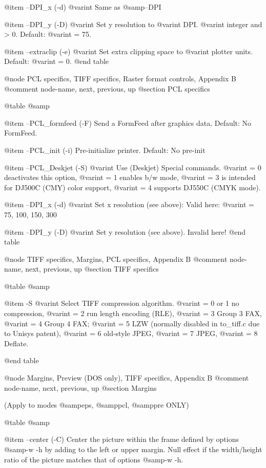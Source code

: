 @item --DPI_x (-d) @var{int}
Same as @samp{--DPI}

@item --DPI_y (-D) @var{int}
Set y resolution to @var{int} DPI. @var{int} integer and > 0.
Default: @var{int} = 75.

@item --extraclip (-e) @var{int}
Set extra clipping space to @var{int} plotter units. Default: @var{int} = 0.
@end table



@node PCL specifics, TIFF specifics, Raster format controls, Appendix B
@comment  node-name,  next,  previous,  up
@section  PCL specifics

@table @samp

@item --PCL_formfeed (-F)
Send a FormFeed after graphics data. Default: No FormFeed.

@item --PCL_init (-i)
Pre-initialize printer. Default: No pre-init

@item --PCL_Deskjet (-S) @var{int}
Use (Deskjet) Special commands. @var{int} = 0 deactivates this option,
@var{int} = 1 enables b/w mode, @var{int} = 3 is intended for DJ500C
(CMY) color support, @var{int} = 4 supports DJ550C (CMYK mode).

@item --DPI_x (-d) @var{int}
Set x resolution (see above): Valid here: @var{int} = 75, 100, 150, 300

@item --DPI_y (-D) @var{int}
Set y resolution (see above). Invalid here!
@end table

@node TIFF specifics, Margins, PCL specifics, Appendix B
@comment  node-name,  next,  previous,  up
@section TIFF specifics

@table @samp


@item -S @var{int}
Select TIFF compression algorithm. @var{int} = 0 or 1 no compression,
@var{int} = 2 run length encoding (RLE), @var{int} = 3 Group 3 FAX,
@var{int} = 4 Group 4 FAX; @var{int} = 5 LZW (normally disabled in to_tiff.c
due to Unisys patent), @var{int} = 6 old-style JPEG, @var{int} = 7 JPEG,
@var{int} = 8 Deflate.

@end table



@node Margins, Preview (DOS only), TIFF specifics, Appendix B
@comment  node-name,  next,  previous,  up
@section  Margins

(Apply to modes @samp{eps}, @samp{pcl}, @samp{pre} ONLY)

@table @samp

@item --center (-C)
Center the picture within the frame defined by options @samp{-w -h} by
adding to the left or upper margin. Null effect if the width/height
ratio of the picture matches that of options @samp{-w -h}.

